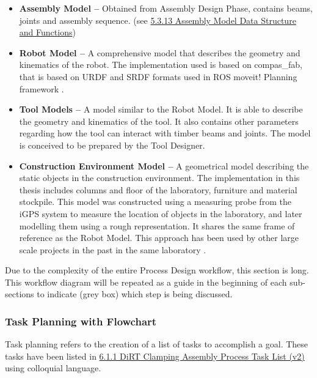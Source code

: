 \begin{itemize}
	\item \textbf{Assembly Model --} Obtained from Assembly Design Phase, contains beams, joints and assembly sequence. (see \ul{5.3.13 Assembly Model Data Structure and Functions})

	\item \textbf{Robot Model --} A comprehensive model that describes the geometry and kinematics of the robot. The implementation used is based on compas\_fab, that is based on URDF and SRDF formats used in ROS moveit! Planning framework \parencite{SrdfROSWiki2023, UrdfROSWiki2023}.

	\item \textbf{Tool Models --} A model similar to the Robot Model. It is able to describe the geometry and kinematics of the tool. It also contains other parameters regarding how the tool can interact with timber beams and joints. The model is conceived to be prepared by the Tool Designer.

	\item \textbf{Construction Environment Model --} A geometrical model describing the static objects in the construction environment. The implementation in this thesis includes columns and floor of the laboratory, furniture and material stockpile. This model was constructed using a measuring probe from the iGPS system to measure the location of objects in the laboratory, and later modelling them using a rough representation. It shares the same frame of reference as the Robot Model. This approach has been used by other large scale projects in the past in the same laboratory \parencite{thomaRoboticFabricationBespoke2018}.

\end{itemize}
Due to the complexity of the entire Process Design workflow, this section is long. This workflow diagram will be repeated as a guide in the beginning of each sub-sections to indicate (grey box) which step is being discussed.

\subsubsection{Task Planning with Flowchart}

Task planning refers to the creation of a list of tasks to accomplish a goal. These tasks have been listed in \ul{6.1.1 DiRT Clamping Assembly Process Task List (v2)} using colloquial language.




